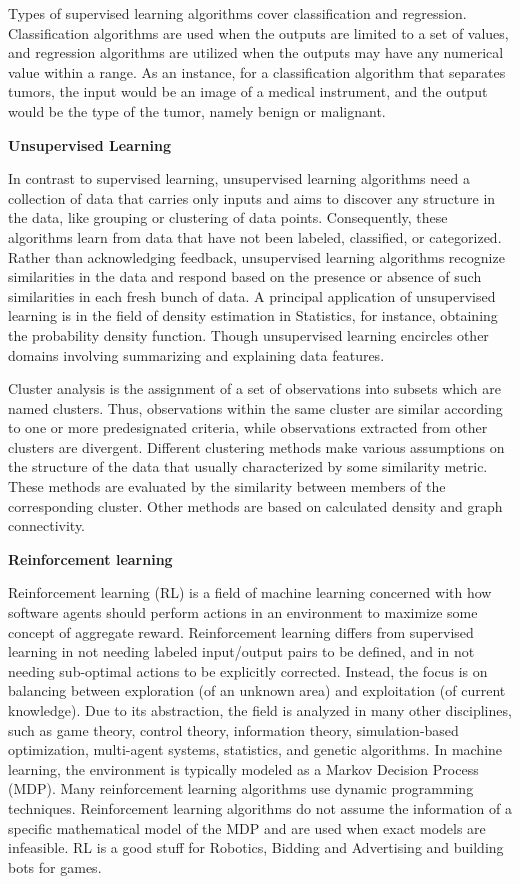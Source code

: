 Types of supervised learning algorithms cover classification and regression.
Classification algorithms are used when the outputs are limited to a set of values, and regression algorithms are
utilized when the outputs may have any numerical value within a range.
As an instance, for a classification algorithm that separates tumors, the input would be an image of a
medical instrument, and the output would be the type of the tumor,
namely benign or malignant.

{\large \textbf{Unsupervised Learning}}

In contrast to supervised learning, unsupervised learning algorithms need a collection of data that carries only inputs
and aims to discover any structure in the data,
like grouping or clustering of data points.
Consequently, these algorithms learn from data that have not been labeled, classified, or categorized.
Rather than acknowledging feedback, unsupervised learning algorithms recognize similarities in the data and respond
based on the presence or absence of such
similarities in each fresh bunch of data.
A principal application of unsupervised learning is in the field of density estimation in Statistics, for instance,
obtaining the probability density function.
Though unsupervised learning encircles other domains involving summarizing and explaining data features.

Cluster analysis is the assignment of a set of observations into subsets which are named clusters.
Thus, observations within the same cluster are similar according to one or more predesignated criteria,
while observations extracted from other clusters are divergent.
Different clustering methods make various assumptions on the structure of the data that usually
characterized by some similarity metric.
These methods are evaluated by the similarity between members of the corresponding cluster.
Other methods are based on calculated density and graph connectivity.

\newpage

{\large \textbf{Reinforcement learning}}

Reinforcement learning (RL) is a field of machine learning concerned with how software agents should perform
actions in an environment to maximize some concept of aggregate reward.
Reinforcement learning differs from supervised learning in not needing labeled input/output pairs to be defined,
and in not needing sub-optimal actions to be explicitly corrected.
Instead, the focus is on balancing between exploration (of an unknown area) and exploitation (of current knowledge).
Due to its abstraction, the field is analyzed in many other disciplines, such as game theory, control theory,
information theory, simulation-based optimization,
multi-agent systems, statistics, and genetic algorithms.
In machine learning, the environment is typically modeled as a Markov Decision Process (MDP).
Many reinforcement learning algorithms use dynamic programming techniques.
Reinforcement learning algorithms do not assume the information of a specific mathematical model of the
MDP and are used when exact models are infeasible.
RL is a good stuff for Robotics, Bidding and Advertising and building bots for games.

